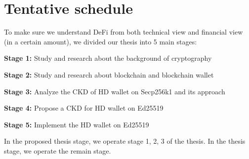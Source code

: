 \section{Tentative schedule}

To make sure we understand DeFi from both technical view and financial view (in a certain amount), we divided our thesis into 5 main stages:

\textbf{Stage 1:} Study and research about the background of cryptography

\textbf{Stage 2:} Study and research about blockchain and blockchain wallet

\textbf{Stage 3:} Analyze the CKD of HD wallet on Secp256k1 and its approach

\textbf{Stage 4:} Propose a CKD for HD wallet on Ed25519

\textbf{Stage 5:} Implement the HD wallet on Ed25519

In the proposed thesis stage, we operate stage 1, 2, 3 of the thesis. In the thesis stage, we operate the remain stage.